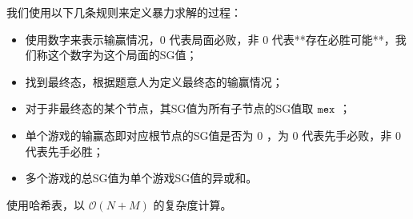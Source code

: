 我们使用以下几条规则来定义暴力求解的过程：

\begin{itemize}
    \item 使用数字来表示输赢情况，$0$ 代表局面必败，非 $0$ 代表**存在必胜可能**，我们称这个数字为这个局面的SG值；
    \item 找到最终态，根据题意人为定义最终态的输赢情况；
    \item 对于非最终态的某个节点，其SG值为所有子节点的SG值取 $\tt{}mex$ ；
    \item 单个游戏的输赢态即对应根节点的SG值是否为 $0$ ，为 $0$ 代表先手必败，非 $0$ 代表先手必胜；
    \item 多个游戏的总SG值为单个游戏SG值的异或和。
\end{itemize}

使用哈希表，以 $\mathcal{O} (N + M)$ 的复杂度计算。
